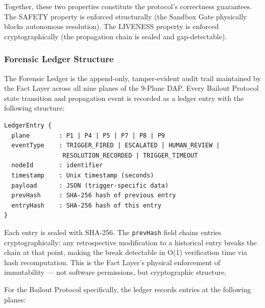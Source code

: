 Together, these two properties constitute the protocol's correctness guarantees. The SAFETY property is enforced structurally (the Sandbox Gate physically blocks autonomous resolution). The LIVENESS property is enforced cryptographically (the propagation chain is sealed and gap-detectable).

\subsubsection{Forensic Ledger Structure}
\label{sec:forensic-ledger}

The Forensic Ledger is the append-only, tamper-evident audit trail maintained by the Fact Layer across all nine planes of the 9-Plane DAP. Every Bailout Protocol state transition and propagation event is recorded as a ledger entry with the following structure:

\begin{verbatim}
LedgerEntry {
  plane        : P1 | P4 | P5 | P7 | P8 | P9
  eventType    : TRIGGER_FIRED | ESCALATED | HUMAN_REVIEW |
                RESOLUTION_RECORDED | TRIGGER_TIMEOUT
  nodeId       : identifier
  timestamp    : Unix timestamp (seconds)
  payload      : JSON (trigger-specific data)
  prevHash     : SHA-256 hash of previous entry
  entryHash    : SHA-256 hash of this entry
}
\end{verbatim}

Each entry is sealed with SHA-256. The \texttt{prevHash} field chains entries cryptographically: any retrospective modification to a historical entry breaks the chain at that point, making the break detectable in O(1) verification time via hash recomputation. This is the Fact Layer's physical enforcement of immutability --- not software permissions, but cryptographic structure.

For the Bailout Protocol specifically, the ledger records entries at the following planes:

